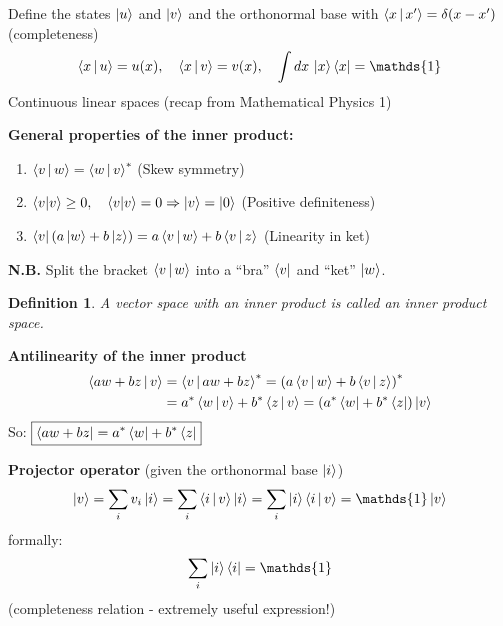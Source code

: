 \documentclass{article}
\newtheorem{definition}[theorem]{Definition}
\begin{document}
\noindent
Define the states $\ket{u}$ and $\ket{v}$ and the orthonormal base with $\Braket{x|x'} = \delta(x - x')$ (completeness)
\begin{equation}
    \Braket{x|u} = u(x), \quad \Braket{x|v} = v(x), \quad \int dx\, \ket{x}\bra{x} = \mathds{1}
\end{equation}
Continuous linear spaces (recap from Mathematical Physics 1)

\vspace{2mm}\noindent
\textbf{General properties of the inner product:}
\begin{enumerate}
    \item $\Braket{v | w} = \Braket{w | v}^*$ (Skew symmetry)
    \item $\braket{v} \geq 0, \quad \braket{v} = 0 \Rightarrow \ket{v} = \ket{0}
$ (Positive definiteness)
    \item $\bra{v}  (a \ket{w} + b \ket{z}) = a \Braket{v | w} + b \Braket{v | z}
$ (Linearity in ket)
\end{enumerate}

\noindent
\textbf{N.B.} Split the bracket $\Braket{v|w}$ into a ``bra'' $\bra{v}$ and ``ket'' $\ket{w}$.

\begin{definition}
    A vector space with an inner product is called an inner product space.
\end{definition}

\noindent
\textbf{Antilinearity of the inner product}
\begin{align*}
    \Braket{a w + b z | v}
&= \Braket{v | a w + b z}^*
= \left( a \Braket{v | w} + b \Braket{v | z} \right)^*\\
&= a^* \Braket{w | v} + b^* \Braket{z | v}
= ( a^* \bra{w} + b^* \bra{z} ) \ket{v} 
\end{align*}
So: \color{red}$\boxed{\bra{aw + bz} = a^* \bra{w} + b^* \bra{z}}$

\color{black}\newpage

\noindent
\textbf{Projector operator} (given the orthonormal base $\ket{i}$)
\begin{equation}
    \Ket{v} = \sum_i v_i \Ket{i} = \sum_i \Braket{i | v} \Ket{i}  = \sum_i \Ket{i} \Braket{i | v} = \mathds{1} \Ket{v}
\end{equation}
formally:
\begin{equation}
    \sum_i \ket{i} \bra{i} = \mathds{1}
\end{equation}
(completeness relation - extremely useful expression!)
\end{document}
